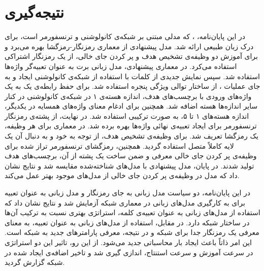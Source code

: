 \chapter{نتیجه‌گیری}
\pagebreak
در این پایان‌نامه، ، که مدلی مبتنی بر شبکه‌ی کانولوشنی و ترنسفورمر است، برای درک زبان طبیعی ارائه شد. مدل پیشنهادی از معماری رمزنگار-رمزگشا بهره می‌برد و برای آموزش دو وظیفه‌ی تشخیص هدف و پر کردن جای خالی، از یک رمزنگار اشتراکی استفاده می‌کرد. در معماری پیشنهادی، مدل زبانی برت به عنوان تعبیه‌گر واژه‌ها استفاده شد. سپس نمایش جدیدی از کلمات با استفاده از شبکه‌ی کانولوشنی ایجاد و به جای عملیات ، از ساختار توالی ویژگی پنجره استفاده شد. برای حفظ رابطه‌ی یک به یک واژه‌های ورودی با برچسب‌های هدف، اندازه هسته‌ی ۱ در شبکه‌ی کانولوشنی در کنار سایر اندازه‌ها هسته اضافه شد. همچنین برای ادغام معنای واژه‌های همسایه در یکدیگر، اندازه هسته‌های ۱ تا ۵، به صورت ترکیبی استفاده شد. در نهایت، از پشته‌ی رمزنگار ترنسفورمر برای ایجاد تعبیه‌ی نهائی واژه‌ها بهره برده شد. در معماری  برای هر وظیفه، یک رمزگشا تعریف شد.
برای وظیفه‌ی تشخیص هدف، از توجه به خود و به دنبال آن یک لایه کاملاً متصل استفاده گردید.  همچنین، رمزگشای ترنسفورمر تراز شده برای وظیفه‌ی پر کردن جای خالی معرفی و ضمن ساخت یک پشته از آن، برچسب‌های هدف تولید شدند.  در پایان، مدل پیشنهادی با مدل‌های شناخته‌شده مقایسه شد و نتایج نشان داد که مدل  در وظیفه‌ی پر کردن جای خالی از مدل‌های موجود بهتر عمل می‌کند. 


در این پایان‌نامه، دو سیاست مدل زبانی به جای رمزنگار و مدل زبانی به عنوان تعبیه برای به کارگیری مدل‌های زبانی در معماری شبکه آزمایش شد و نتایج نشان داد که استفاده از مدل‌های زبانی به عنوان تعبیه‌ی کلمه، استراتژی بهتری نسبت به ترکیب آن‌ها در ساختار شبکه دارد. در مقابل، استفاده از مدل‌های زبانی به عنوان تعبیه، به معنای معرفی یک رمزنگار جدا برای شبکه و در نتیجه، معرفی پارامترهای جدید به شبکه است. این امر ذاتاً باعث ایجاد بار محاسباتی جدید می‌شود. از این رو،  تاثیر این دو استراتژی در سرعت آموزش و سرعت استنتاج، اندازی گیری شد و تاخیر اضافه‌ی ایجاد شده در شبکه گزارش گردید.


